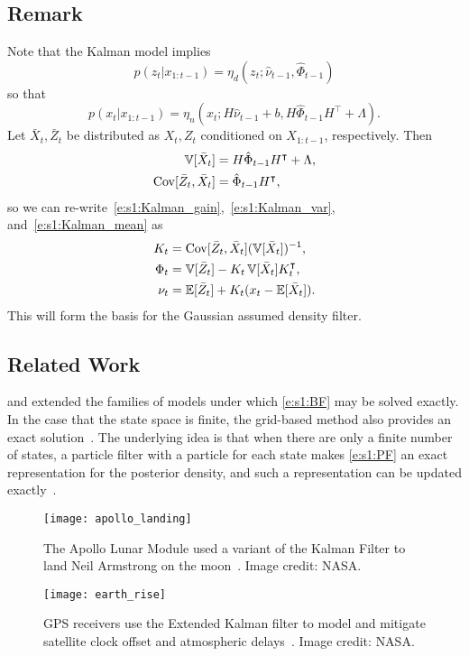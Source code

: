 \subsection{Remark}
Note that the Kalman model implies
\begin{equation}
p(z_t|x_{1:t-1}) = \eta_d(z_t;\hat\nu_{t-1},\hat\Phi_{t-1})
\end{equation}
so that
\begin{equation}
p(x_t|x_{1:t-1})= \eta_n(x_t;H\hat\nu_{t-1}+b,H\hat\Phi_{t-1}H^\intercal+\Lambda).
\end{equation}
Let $\bar X_t, \bar Z_t$ be distributed as $X_t,Z_t$ conditioned on $X_{1:t-1}$, respectively.  Then
\begin{align}
\operatorname{\mathbb{V}}[\bar X_t] &= H\hat\Phi_{t-1}H^\intercal+\Lambda, \\
\operatorname{Cov}[\bar Z_t, \bar X_t] &= \hat\Phi_{t-1}H^\intercal,
\end{align}
so we can re-write~\eqref{e:s1:Kalman_gain},~\eqref{e:s1:Kalman_var}, and~\eqref{e:s1:Kalman_mean} as
\begin{align}
K_t &= \operatorname{Cov}[\bar Z_t, \bar X_t] (\operatorname{\mathbb{V}}[\bar X_t])^{-1} \label{e:s1:KF_gain_alt}, \\
\Phi_t 
& = \operatorname{\mathbb{V}}[\bar Z_t] - K_t \operatorname{\mathbb{V}}[\bar X_t] K_t^\intercal \label{e:s1:KF_var_alt}, \\
\nu_t &= \mathbb{E}[\bar Z_t] + K_t(x_t - \mathbb{E}[\bar X_t]). \label{e:s1:KF_mean_alt}
\end{align}
This will form the basis for the Gaussian assumed density filter.

\subsection{Related Work}
\textcite{Ben81} and \textcite{Dau84,Dau86,Dau05} extended the families of models under which \eqref{e:s1:BF} may be solved exactly.  In the case that the state space is finite, the grid-based method also provides an exact solution~\cite{Seg76,Mar79,Ell94,Ell94b,Aru02,Kal16}.  The underlying idea is that when there are only a finite number of states, a particle filter with a particle for each state makes \eqref{e:s1:PF} an exact representation for the posterior density, and such a representation can be updated exactly~\cite{Aru02}.

\begin{figure}[h]
\begin{minipage}[t]{.45\textwidth}
\texttt{[image: apollo\_landing]}
\caption[A photo from the Apollo 11 Lunar Landing]{The Apollo Lunar Module used a variant of the Kalman Filter to land Neil Armstrong on the moon~\cite{Hal66,Hoa69,Bat70}.  Image credit: \textsc{NASA}.}
\end{minipage}%
\hfill
\begin{minipage}[t]{.45\textwidth}
\texttt{[image: earth\_rise]}
\caption[Earthrise]{GPS receivers use the Extended Kalman filter to model and mitigate satellite clock offset and atmospheric delays~\cite{Axe95,Hof01}. Image credit: \textsc{NASA}.}
\end{minipage}
\end{figure}


